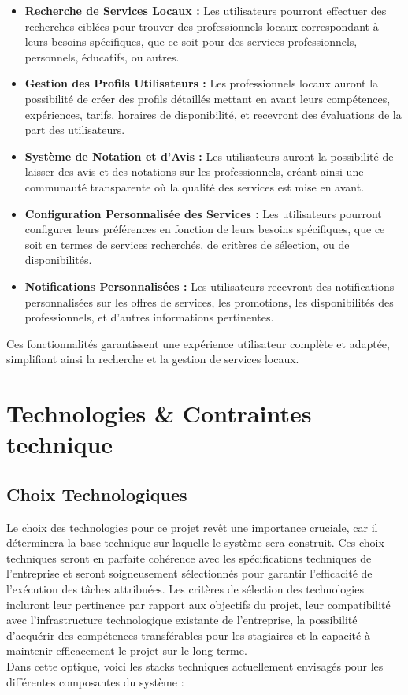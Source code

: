 {\begin{itemize}
    \item \textbf{Recherche de Services Locaux :} Les utilisateurs pourront effectuer des recherches ciblées pour trouver des professionnels locaux correspondant à leurs besoins spécifiques, que ce soit pour des services professionnels, personnels, éducatifs, ou autres.

    \item \textbf{Gestion des Profils Utilisateurs :} Les professionnels locaux auront la possibilité de créer des profils détaillés mettant en avant leurs compétences, expériences, tarifs, horaires de disponibilité, et recevront des évaluations de la part des utilisateurs.

    \item \textbf{Système de Notation et d'Avis :} Les utilisateurs auront la possibilité de laisser des avis et des notations sur les professionnels, créant ainsi une communauté transparente où la qualité des services est mise en avant.

    \item \textbf{Configuration Personnalisée des Services :} Les utilisateurs pourront configurer leurs préférences en fonction de leurs besoins spécifiques, que ce soit en termes de services recherchés, de critères de sélection, ou de disponibilités.

    \item \textbf{Notifications Personnalisées :} Les utilisateurs recevront des notifications personnalisées sur les offres de services, les promotions, les disponibilités des professionnels, et d'autres informations pertinentes.

\end{itemize}

Ces fonctionnalités garantissent une expérience utilisateur complète et adaptée, simplifiant ainsi la recherche et la gestion de services locaux.

\chapter{Technologies \& Contraintes technique }

\section{Choix Technologiques}
Le choix des technologies pour ce projet revêt une importance cruciale, car il déterminera la base technique sur laquelle le système sera construit. Ces choix techniques seront en parfaite cohérence avec les spécifications techniques de l'entreprise et seront soigneusement sélectionnés pour garantir l'efficacité de l'exécution des tâches attribuées. Les critères de sélection des technologies incluront leur pertinence par rapport aux objectifs du projet, leur compatibilité avec l'infrastructure technologique existante de l'entreprise, la possibilité d'acquérir des compétences transférables pour les stagiaires et la capacité à maintenir efficacement le projet sur le long terme.
\\
Dans cette optique, voici les stacks techniques actuellement envisagés pour les différentes composantes du système : 
}

